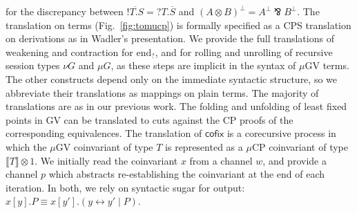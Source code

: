 \documentclass[orivec,envcountsame]{llncs}
\newcommand{\parr}{\mathbin\bindnasrepma}
\newcommand{\cpdual}[1]{#1^\perp}
\newcommand{\gvdual}[1]{\overline{#1}}
\newcommand{\gvout}[2]{{!#1.#2}}
\newcommand{\gvin}[2]{{?#1.#2}}
\newcommand{\lto}{\ensuremath{\multimap}}
\newcommand{\interm}{\mathrm{end}_?}
\newcommand{\gvtyp}[3]{#1 \vdash #2 : #3}
\newcommand{\mapname}{\mathsf{map}}
\newcommand{\map}[3]{\mapname^{#1}_{#2}(#3)}
\newcommand{\mkwd}[1]{\mathsf{#1}}
\newcommand{\link}[2]{#1 \leftrightarrow #2}
\newcommand{\cut}[4]{\mkwd{new}\:#1 \: (#3 \mid #4)}
\newcommand{\rec}[1]{\mkwd{rec}\:#1}
\newcommand{\corec}[5]{\mkwd{corec}\:#1 \langle #2 \rangle (#4,#5)}
\newcommand{\lrkwd}{\mkwd{cofix}}
\newcommand{\cofix}{\lrkwd}
\newcommand{\tocpbig}[1]{\left\llbracket #1 \right\rrbracket}
\newcommand{\tocp}[1]{\llbracket #1 \rrbracket}
\newcommand{\mucp}{$\mu\mathrm{CP}$\xspace}
\newcommand{\mugv}{$\mu\mathrm{GV}$\xspace}
\begin{document}
for the discrepancy between $\gvdual{\gvout{T}{S}} = \gvin{T}{\gvdual{S}}$ and $\cpdual{(A \otimes
  B)} = \cpdual{A} \parr \cpdual{B}.$
%
The translation on terms (Fig.~\ref{fig:tomucp}) is formally specified as a CPS translation on
derivations as in Wadler's presentation. We provide the full translations of weakening and
contraction for $\interm$, and for rolling and unrolling of recursive session types $\nu G$ and $\mu
G$, as these steps are implicit in the syntax of \mugv terms. The other constructs depend only on
the immediate syntactic structure, so we abbreviate their translations as mappings on plain
terms. The majority of translations are as in our previous work.  The folding and unfolding of least
fixed points in GV can be translated to cuts against the CP proofs of the corresponding
equivalences. The translation of $\cofix$ is a corecursive process in which the \mugv coinvariant of
type $T$ is represented as a \mucp coinvariant of type $\tocp{T} \otimes 1$.  We initially
read the coinvariant $x$ from a channel $w$, and provide a channel $p$ which abstracts
re-establishing the coinvariant at the end of each iteration.  In both, we rely on syntactic sugar
for output: $x[y].P \equiv x[y'].(\link{y}{y'} \mid P)$.

%
%
\end{document}
